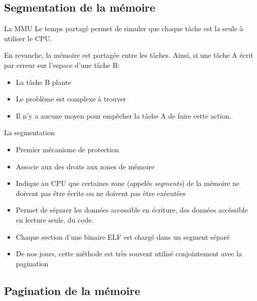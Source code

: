 \subsection{Segmentation de la mémoire}

\begin{frame}{La MMU}
  Le temps partagé  permet de simuler que chaque tâche  est la seule à
  utiliser le CPU.

  En revanche, la mémoire est partagée entre les tâches. Ainsi, si une
  tâche A écrit par erreur sur l'espace d'une tâche B:
  \begin{itemize}
  \item  La tâche B plante
  \item  Le problème est complexe à trouver
  \item Il  n'y a  aucune moyen  pour empêcher la  tâche A  de faire
    cette action.
  \end{itemize}
\end{frame}

\begin{frame}[fragile=singleslide]{La segmentation}
  \begin{itemize}
    \item Premier mécanisme de protection
    \item Associe aux des droits aux zones de mémoire
    \item Indique au CPU  que certaines zone (appelés \emph{segments})
      de la mémoire ne doivent pas  être écrite ou ne doivent pas être
      exécutées
    \item Permet  de séparer les  données accessible en  écriture, des
      données accéssible en lecture seule, du code.
    \item Chaque section d'une binaire ELF est  chargé dans un
      segment séparé
    \item  De  nos  jours,  cette  méthode est  très  souvent  utilisé
      conjointement avec la pagination
  \end{itemize}
\end{frame}

\subsection{Pagination de la mémoire}


